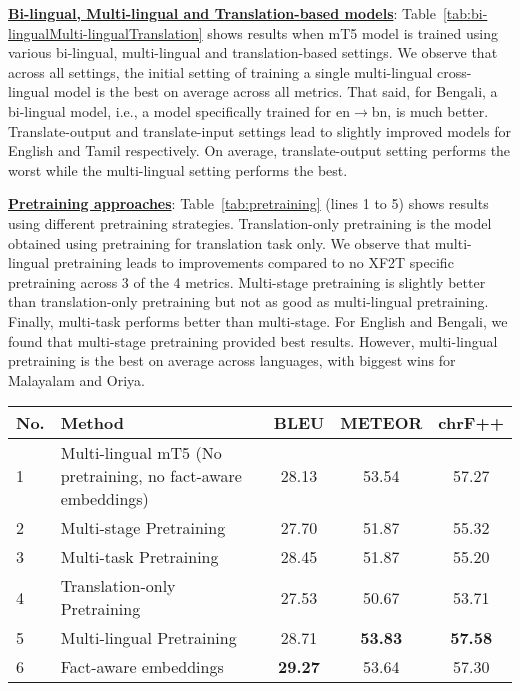 \documentclass[runningheads]{llncs}
\newcommand{\data}{\textsc{XAlignV2}}
\begin{document}
\noindent\underline{\textbf{Bi-lingual, Multi-lingual and Translation-based models}}: Table~\ref{tab:bi-lingualMulti-lingualTranslation} shows results when mT5 model is trained using various bi-lingual, multi-lingual and translation-based settings. We observe that across all settings, the initial setting of training a single multi-lingual cross-lingual model is the best on average across all metrics. That said, for Bengali, a bi-lingual model, i.e., a model specifically trained for en$\rightarrow$bn, is much better. Translate-output and translate-input settings lead to slightly improved models for English and Tamil respectively. On average, translate-output setting performs the worst while the multi-lingual setting performs the best.







\noindent\underline{\textbf{Pretraining approaches}}: Table~\ref{tab:pretraining} (lines 1 to 5) shows results using different pretraining strategies. Translation-only pretraining is the model obtained using pretraining for translation task only. We observe that multi-lingual pretraining leads to improvements compared to no XF2T specific pretraining across 3 of the 4 metrics. Multi-stage pretraining is slightly better than translation-only pretraining but not as good as multi-lingual pretraining. Finally, multi-task performs better than multi-stage. For English and Bengali, we found that multi-stage pretraining provided best results. However, multi-lingual pretraining is the best on average across languages, with biggest wins for Malayalam and Oriya. 

\begin{table*}
    \centering
    \scriptsize
    \begin{tabular}{|l|p{2.5in}||c|c|c|}
\hline
No.&Method&BLEU&METEOR&chrF++\\
\hline
\hline
1&Multi-lingual mT5 (No pretraining, no fact-aware embeddings) &28.13&53.54&57.27\\
\hline
2&Multi-stage Pretraining&27.70&51.87&55.32\\
\hline
3&Multi-task Pretraining&28.45&51.87&55.20\\
\hline
4&Translation-only  Pretraining&27.53&50.67&53.71\\
\hline
5&Multi-lingual Pretraining&28.71&\textbf{53.83}&\textbf{57.58}\\
\hline
6&Fact-aware embeddings&\textbf{29.27}&53.64&57.30\\
\hline
\end{tabular}
    \caption{XF2T scores on \data{} test set using different pretraining strategies and fact-aware embeddings for the mT5 model. Best results  are highlighted.}
    \label{tab:pretraining}
\end{table*}
\end{document}

